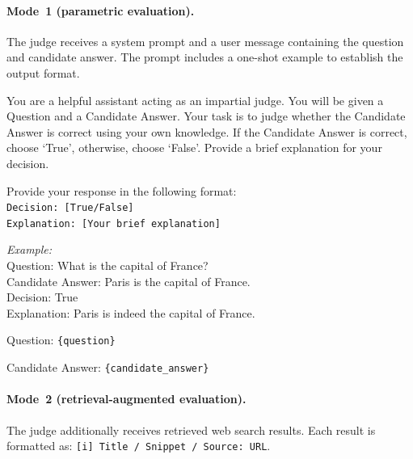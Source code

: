 \paragraph{Mode~1 (parametric evaluation).}
The judge receives a system prompt and a user message containing the question and candidate answer. The prompt includes a one-shot example to establish the output format.

\begin{tcolorbox}[colback=gray!5, colframe=gray!60, title={\small Mode 1: Judge System Prompt}, fonttitle=\bfseries\small, fontupper=\small]
You are a helpful assistant acting as an impartial judge. You will be given a Question and a Candidate Answer. Your task is to judge whether the Candidate Answer is correct using your own knowledge. If the Candidate Answer is correct, choose `True', otherwise, choose `False'. Provide a brief explanation for your decision.

\medskip
Provide your response in the following format:\\
\texttt{Decision: [True/False]}\\
\texttt{Explanation: [Your brief explanation]}

\medskip
\textit{Example:}\\
Question: What is the capital of France?\\
Candidate Answer: Paris is the capital of France.\\
Decision: True\\
Explanation: Paris is indeed the capital of France.
\end{tcolorbox}

\begin{tcolorbox}[colback=blue!3, colframe=blue!40, title={\small Mode 1: User Message}, fonttitle=\bfseries\small, fontupper=\small]
Question: \texttt{\{question\}}

Candidate Answer: \texttt{\{candidate\_answer\}}
\end{tcolorbox}

\paragraph{Mode~2 (retrieval-augmented evaluation).}
The judge additionally receives retrieved web search results. Each result is formatted as: \texttt{[i] Title / Snippet / Source: URL}.


